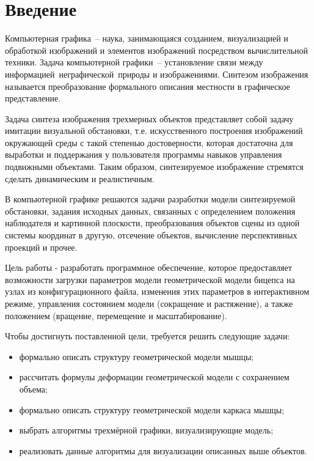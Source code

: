 \chapter*{Введение}

Компьютерная графика – наука, занимающаяся созданием, визуализацией и обработкой изображений и элементов изображений посредством вычислительной техники. Задача компьютерной графики – установление связи между информацией неграфической природы и изображениями. Синтезом изображения называется преобразование формального описания местности в графическое представление.

Задача синтеза изображения трехмерных объектов представляет собой задачу имитации визуальной обстановки, т.е. искусственного построения изображений окружающей среды с такой степенью достоверности, которая достаточна для выработки и поддержания у пользователя программы навыков управления подвижными объектами. Таким образом, синтезируемое изображение стремятся сделать динамическим и реалистичным.

В компьютерной графике решаются задачи разработки модели синтезируемой обстановки, задания исходных данных, связанных с определением положения наблюдателя и картинной плоскости, преобразования объектов сцены из одной системы координат в другую, отсечение объектов, вычисление перспективных проекций и прочее.

Цель работы - разработать программное обеспечение, которое предоставляет возможности загрузки параметров модели геометрической модели бицепса на узлах из конфигурационного файла, изменения этих параметров в интерактивном режиме, управления состоянием модели (сокращение и растяжение), а также положением (вращение, перемещение и масштабирование).

Чтобы достигнуть поставленной цели, требуется решить следующие задачи:
\begin{itemize}
    \item формально описать структуру геометрической модели мышцы;
    \item рассчитать формулы деформации геометрической модели с сохранением объема;
    \item формально описать структуру геометрической модели каркаса мышцы;
    \item выбрать алгоритмы трехмёрной графики, визуализирующие модель;
    \item реализовать данные алгоритмы для визуализации описанных выше объектов.
\end{itemize}
